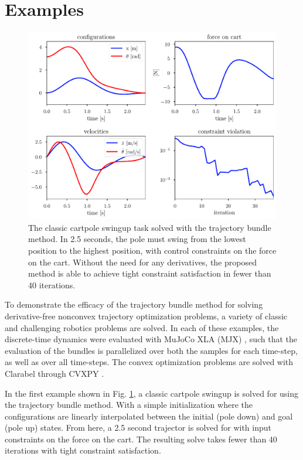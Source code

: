 %
%
%
\section{Examples}
%
%
%
\begin{figure}
    \centering
    \includegraphics[width=0.9\linewidth]{bundles/examples/cartpole_fig.pdf}
    \caption{The classic cartpole swingup task solved with the trajectory bundle method. In 2.5 seconds, the pole must swing from the lowest position to the highest position, with control constraints on the force on the cart. Without the need for any derivatives, the proposed method is able to achieve tight constraint satisfaction in fewer than 40 iterations.}
    \label{fig:btb:cartpole}
\end{figure}

To demonstrate the efficacy of the trajectory bundle method for solving derivative-free nonconvex trajectory optimization problems, a variety of classic and challenging robotics problems are solved. In each of these examples, the discrete-time dynamics were evaluated with MuJoCo XLA (MJX) \cite{todorov2012}, such that the evaluation of the bundles is parallelized over both the samples for each time-step, as well as over all time-steps. The convex optimization problems are solved with Clarabel \cite{goulart2024} through CVXPY \cite{diamond}.

In the first example shown in Fig. \ref{fig:btb:cartpole}, a classic cartpole swingup is solved for using the trajectory bundle method. With a simple initialization where the configurations are linearly interpolated between the initial (pole down) and goal (pole up) states. From here, a 2.5 second trajector is solved for with input constraints on the force on the cart. The resulting solve takes fewer than 40 iterations with tight constraint satisfaction. 

